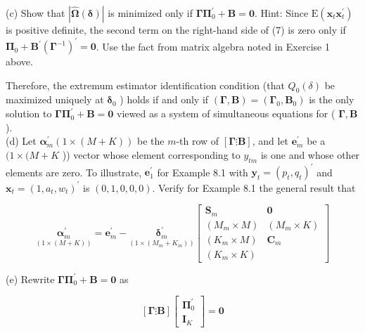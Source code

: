 \documentclass[10pt]{article}
\begin{document}
(c) Show that $|\widehat{\boldsymbol{\Omega}}(\boldsymbol{\delta})|$ is minimized only if $\boldsymbol{\Gamma} \boldsymbol{\Pi}_{0}^{\prime}+\mathbf{B}=\mathbf{0}$. Hint: Since $\mathrm{E}\left(\mathbf{x}_{t} \mathbf{x}_{t}^{\prime}\right)$ is positive definite, the second term on the right-hand side of (7) is zero only if $\boldsymbol{\Pi}_{0}+\mathbf{B}^{\prime}\left(\boldsymbol{\Gamma}^{-1}\right)^{\prime}=\mathbf{0}$. Use the fact from matrix algebra noted in Exercise 1 above.

Therefore, the extremum estimator identification condition (that $Q_{0}(\delta)$ be maximized uniquely at $\boldsymbol{\delta}_{0}$ ) holds if and only if $(\boldsymbol{\Gamma}, \mathbf{B})=\left(\boldsymbol{\Gamma}_{0}, \mathbf{B}_{0}\right)$ is the only solution to $\boldsymbol{\Gamma} \boldsymbol{\Pi}_{0}^{\prime}+\mathbf{B}=\mathbf{0}$ viewed as a system of simultaneous equations for ( $\boldsymbol{\Gamma}, \mathbf{B}$ ).\\
(d) Let $\boldsymbol{\alpha}_{m}^{\prime}(1 \times(M+K))$ be the $m$-th row of $[\mathbf{\Gamma} \vdots \mathbf{B}]$, and let $\mathbf{e}_{m}^{\prime}$ be a $(1 \times(M+ K$ )) vector whose element corresponding to $y_{t m}$ is one and whose other elements are zero. To illustrate, $\mathbf{e}_{1}^{\prime}$ for Example 8.1 with $\mathbf{y}_{t}=\left(p_{t}, q_{t}\right)^{\prime}$ and $\mathbf{x}_{t}=\left(1, a_{t}, w_{t}\right)^{\prime}$ is $(0,1,0,0,0)$. Verify for Example 8.1 the general result that

\[
\underset{(1 \times(M+K))}{\boldsymbol{\alpha}_{m}^{\prime}}=\mathbf{e}_{m}^{\prime}-\underset{\left(1 \times\left(M_{m}+K_{m}\right)\right)}{\boldsymbol{\delta}_{m}^{\prime}}\left[\begin{array}{cc}
\mathbf{S}_{m} & \mathbf{0}  \tag{8}\\
\left(M_{m} \times M\right) & \left(M_{m} \times K\right) \\
\left(K_{m} \times M\right) & \mathbf{C}_{m} \\
\left(K_{m} \times K\right)
\end{array}\right]
\]

(e) Rewrite $\boldsymbol{\Gamma} \boldsymbol{\Pi}_{0}^{\prime}+\mathbf{B}=\mathbf{0}$ as

\[
[\boldsymbol{\Gamma} \vdots \mathbf{B}]\left[\begin{array}{l}
\boldsymbol{\Pi}_{0}^{\prime}  \tag{9}\\
\mathbf{I}_{K}
\end{array}\right]=\mathbf{0}
\]
\end{document}
